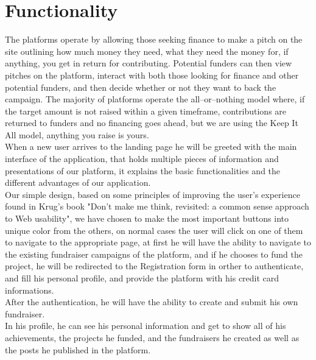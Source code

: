 \section{Functionality}
The platforms operate by allowing those seeking finance to make a pitch on the site outlining how much money they need, what they need the money for, if anything, you get in return for contributing. Potential funders can then view pitches on the platform, interact with both those looking for finance and other potential funders, and then decide whether or not they want to back the campaign. The majority of platforms operate the all–or–nothing model where, if the target amount is not raised within a given timeframe, contributions are returned to funders and no financing goes ahead, but we are using the Keep It All model, anything you raise is yours.\\

When a new user arrives to the landing page he will be greeted with the main interface of the application, that holds multiple pieces of information and presentations of our platform, it explains the basic functionalities and the different advantages of our application.\\

Our simple design, based on some principles of improving the user's experience found in Krug's book "Don't make me think, revisited: a common sense approach to Web usability", we have chosen to make the most important buttons into unique color from the others, on normal cases the user will click on one of them to navigate to the appropriate page, at first he will have the ability to navigate to the existing fundraiser campaigns of the platform, and if he chooses to fund the project, he will be redirected to the Registration form in orther to authenticate, and fill his personal profile, and provide the platform with his credit card informations.\\

After the authentication, he will have the ability to create and submit his own fundraiser.\\

In his profile, he can see his personal information and get to show all of his achievements, the projects he funded, and the fundraisers he created as well as the posts he published in the platform. 
